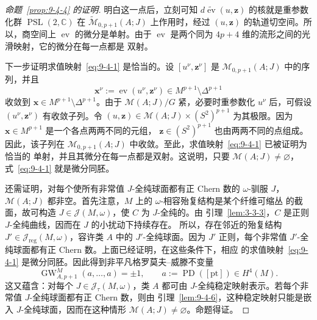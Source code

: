 \begin{proof}[命题~\ref{prop:9-4-4} 的证明]
明白这一点后，立刻可知 $d\widetilde{\operatorname{ev}}(u,\mathbf z)$ 的核就是重参数化群
$\operatorname{PSL}(2,\mathbb C)$ 在 $\widetilde{\mathcal M}_{0,p+1}(A;J)$ 上作用时，经过
$(u,\mathbf z)$ 的轨道切空间。所以，商空间上 $\operatorname{ev}$ 的微分是单射。由于
$\operatorname{ev}$ 是两个同为 $4p+4$ 维的流形之间的光滑映射，它的微分在每一点都是
双射。

下一步证明求值映射~\eqref{eq:9-4-1} 是恰当的。设
$[u^\nu,\mathbf z^\nu]$ 是 $\mathcal M_{0,p+1}(A;J)$ 中的序列，并且
\[
  \mathbf x^\nu:=\operatorname{ev}(u^\nu,\mathbf z^\nu)
  \in M^{p+1}\setminus\Delta^{p+1}
\]
收敛到 $\mathbf x\in M^{p+1}\setminus\Delta^{p+1}$。由于
$\mathcal M(A;J)/G$ 紧，必要时重参数化 $u^\nu$ 后，可假设
$(u^\nu,\mathbf z^\nu)$ 有收敛子列。令
$(u,\mathbf z)\in\mathcal M(A;J)\times(S^2)^{p+1}$ 为其极限。因为
$\mathbf x\in M^{p+1}$ 是一个各点两两不同的元组，
$\mathbf z\in(S^2)^{p+1}$ 也由两两不同的点组成。因此，该子列在
$\mathcal M_{0,p+1}(A;J)$ 中收敛。至此，求值映射~\eqref{eq:9-4-1} 已被证明为恰当的
单射，并且其微分在每一点都是双射。这说明，只要 $\mathcal M(A;J)\ne\varnothing$，
式~\eqref{eq:9-4-1} 就是微分同胚。

还需证明，对每个使所有非常值 $J$-全纯球面都有正 Chern 数的 $\omega$-驯服 $J$，
$\mathcal M(A;J)$ 都非空。首先注意，$M$ 上的 $\omega$-相容殆复结构是某个纤维可缩丛
的截面，故可构造 $J\in\mathcal J(M,\omega)$，使 $C$ 为 $J$-全纯的。由
引理~\ref{lem:3-3-3}，$C$ 是正则 $J$-全纯曲线，因而在 $J$ 的小扰动下持续存在。
所以，存在邻近的殆复结构
$J'\in\mathcal J_{\mathrm{reg}}(M,\omega)$，容许类 $A$ 中的 $J'$-全纯球面。因为
$J'$ 正则，每个非常值 $J'$-全纯球面都有正 Chern 数。上面已经证明，在这些条件下，相应
的求值映射~\eqref{eq:9-4-1} 是微分同胚。因此得到非平凡格罗莫夫--威滕不变量
\[
  \operatorname{GW}^{M}_{A,p+1}(a,\ldots,a)=\pm1,
  \qquad
  a:=\operatorname{PD}([\mathrm{pt}])\in H^4(M).
\]
这又蕴含：对每个 $J\in\mathcal J_\tau(M,\omega)$，类 $A$ 都可由
$J$-全纯稳定映射表示。若每个非常值 $J$-全纯球面都有正 Chern 数，则由
引理~\ref{lem:9-4-6}，这种稳定映射只能是嵌入 $J$-全纯球面，因而在这种情形
$\mathcal M(A;J)\ne\varnothing$。命题得证。
\end{proof}


